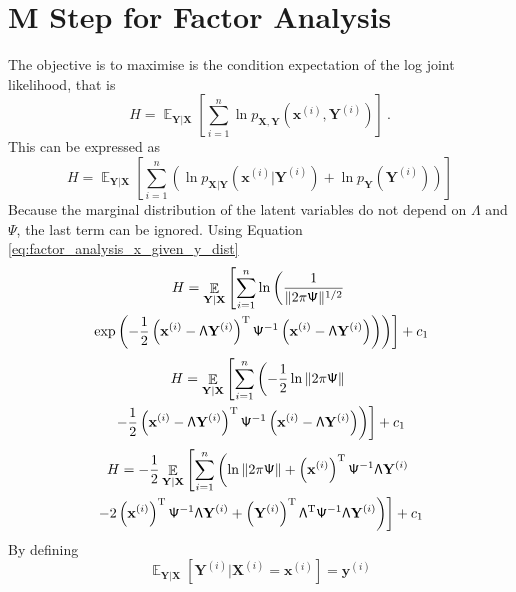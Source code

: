 \documentclass[12pt]{report}
\DeclareMathOperator{\expectation}{\mathbb{E}}
\newcommand{\T}{^\textup{T}}
\newcommand{\vect}[1]{\mathbf{#1}}
\newcommand{\matr}[1]{\mathsf{#1}}
\begin{document}
\section{M Step for Factor Analysis}\label{chapter:mStep_factorAnalysis}
The objective is to maximise is the condition expectation of the log joint likelihood, that is
\begin{equation*}
H = \expectation_{\vect{Y}|\vect{X}}\left[\sum_{i=1}^{n}\ln p_{\vect{X},\vect{Y}}\left(\vect{x}^{(i)},\vect{Y}^{(i)}\right)\right] \ .
\end{equation*}
This can be expressed as
\begin{equation*}
H = \expectation_{\vect{Y}|\vect{X}}\left[
\sum_{i=1}^{n}\left(\ln p_{\vect{X}|\vect{Y}}\left(\vect{x}^{(i)}|\vect{Y}^{(i)}\right)+\ln p_{\vect{Y}}\left(\vect{Y}^{(i)}\right)\right)
\right]
\end{equation*}
Because the marginal distribution of the latent variables do not depend on $\matr{\Lambda}$ and $\matr{\Psi}$, the last term can be ignored. Using Equation \eqref{eq:factor_analysis_x_given_y_dist}
\begin{multline*}
H = \expectation_{\vect{Y}|\vect{X}}\left[
\sum_{i=1}^{n}\ln\left(\frac{1}{\|2\pi\matr{\Psi}\|^{1/2}}
\right.\right.
\\
\left.\left.
\exp\left(-\frac{1}{2}\left(\vect{x}^{(i)}-\matr{\Lambda}\vect{Y}^{(i)}\right)\T\matr{\Psi}^{-1}\left(\vect{x}^{(i)}-\matr{\Lambda}\vect{Y}^{(i)}\right)\right)\right)
\right]
+c_1
\end{multline*}
\begin{multline*}
H = \expectation_{\vect{Y}|\vect{X}}\left[
\sum_{i=1}^{n}\left(-\frac{1}{2}\ln{\|2\pi\matr{\Psi}\|}
\right.\right.
\\
\left.\left.
-\frac{1}{2}\left(\vect{x}^{(i)}-\matr{\Lambda}\vect{Y}^{(i)}\right)\T\matr{\Psi}^{-1}\left(\vect{x}^{(i)}-\matr{\Lambda}\vect{Y}^{(i)}\right)\right)
\right]
+c_1
\end{multline*}
\begin{multline*}
H = -\frac{1}{2}\expectation_{\vect{Y}|\vect{X}}\left[
\sum_{i=1}^{n}\left(\ln{\|2\pi\matr{\Psi}\|}+\left(\vect{x}^{(i)}\right)\T\matr{\Psi}^{-1}\matr{\Lambda}\vect{Y}^{(i)}
\right.\right.
\\
\left.\left.
-2\left(\vect{x}^{(i)}\right)\T\matr{\Psi}^{-1}\matr{\Lambda}\vect{Y}^{(i)}+\left(\vect{Y}^{(i)}\right)\T\matr{\Lambda}\T\matr{\Psi}^{-1}\matr{\Lambda}\vect{Y}^{(i)}\right)
\right]
+c_1
\end{multline*}
By defining
\begin{equation}
\expectation_{\vect{Y}|\vect{X}}\left[\vect{Y}^{(i)}|\vect{X}^{(i)}=\vect{x}^{(i)}\right]=\vect{y}^{(i)}
\end{equation}
\end{document}
